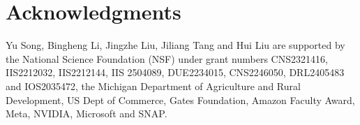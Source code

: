 \documentclass[letterpaper]{article} \usepackage{aaai2026}  \usepackage{times}  \usepackage{helvet}  \usepackage{courier}  \usepackage[hyphens]{url}  \usepackage{graphicx} \urlstyle{rm} \def\UrlFont{\rm}  \usepackage{natbib}  \usepackage{caption} \frenchspacing  \setlength{\pdfpagewidth}{8.5in}  \setlength{\pdfpageheight}{11in}
\begin{document}
\section{Acknowledgments}
Yu Song, Bingheng Li, Jingzhe Liu, Jiliang Tang and Hui Liu are supported by the National Science Foundation (NSF) under grant numbers CNS2321416, IIS2212032, IIS2212144, IIS 2504089, DUE2234015, CNS2246050, DRL2405483 and IOS2035472, the Michigan Department of Agriculture and Rural Development, US Dept of Commerce, Gates Foundation, Amazon Faculty Award, Meta, NVIDIA, Microsoft and SNAP.


\end{document}

